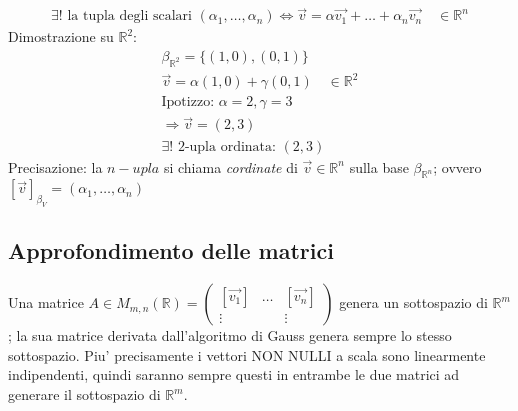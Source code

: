 \documentclass[10pt]{extarticle}
\begin{document}
\begin{align*}
    \exists! \text{ la tupla degli scalari } (\alpha_1,\dots,\alpha_n) \iff \vec{v}=\alpha \vec{v_1}+\dots +\alpha_n \vec{v_n} \quad \in \mathbb{R}^n
\end{align*}
Dimostrazione su $\mathbb{R}^2$:
\begin{align*}
    \beta_{\mathbb{R}^2}=\{(1,0),(0,1)\} \\
    \vec{v}=\alpha(1,0)+\gamma(0,1) \quad \in \mathbb{R}^2\\
    \text{Ipotizzo: $\alpha=2,\gamma=3$}\\
    \Rightarrow \vec{v}=(2,3) \\
    \exists! \text{ 2-upla ordinata: } (2,3)
\end{align*}
Precisazione: la $n-upla$ si chiama \textit{cordinate} di $\vec{v}\in \mathbb{R}^n$ sulla base $\beta_{\mathbb{R}^n}$; ovvero $[\vec{v}]_{\beta_V}=(\alpha_1,\dots,\alpha_n)$
\vspace{2em}\subsection{Approfondimento delle matrici}
Una matrice $A \in M_{m,n}(\mathbb{R})=\begin{pmatrix}
    [\vec{v_1}] & \dots & [\vec{v_n}] \\
    \vdots & & \vdots
\end{pmatrix}$ genera un sottospazio di $\mathbb{R}^m$; la sua matrice derivata dall'algoritmo di Gauss genera sempre lo stesso sottospazio. Piu' precisamente i vettori NON NULLI a scala sono linearmente indipendenti, quindi saranno sempre questi in entrambe le due matrici ad generare il sottospazio di $\mathbb{R}^m$. 
\end{document}
